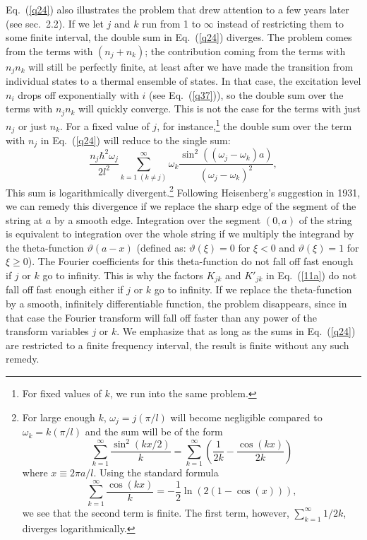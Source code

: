 \documentclass[12pt]{elsart}
\begin{document}
Eq.\ (\ref{q24}) also illustrates the problem that \citet{Heisenberg 1931} drew attention to a few years later (see sec.\ 2.2). If we let $j$ and $k$ run from 1 to $\infty$ instead of restricting them to some finite interval, the double sum in Eq.\ (\ref{q24}) diverges. The problem comes from the terms with $(n_j + n_k)$; the contribution coming from the terms with $n_j n_k$ will still be perfectly finite, at least after we have made the transition from individual states to a thermal ensemble of states. In that case, the excitation level $n_i$ drops off exponentially with $i$ (see Eq.\ (\ref{q37})), so the double sum over the terms with $n_j n_k$ will quickly converge. This is not the case for the terms with just $n_j$ or just $n_k$. For a fixed value of $j$, for instance,\footnote{For fixed values of $k$, we run into the same problem.} the  double sum over the term with $n_j$ in Eq.\ (\ref{q24}) will reduce to the single sum:
\begin{equation}
\frac{n_j \hbar^2 \omega_j}{2l^2}   \sum_{k=1 \; (k \neq j)}^{\infty} \omega_k   \frac{\sin^2{((\omega_j - \omega_k)a)}}{(\omega_j - \omega_k)^2},
\label{q24a} 
\end{equation}
This sum is logarithmically divergent.\footnote{For large enough $k$, $\omega_j = j (\pi/l)$ will become negligible compared to $\omega_k = k (\pi/l)$ and the sum will be of the form 
$$
\sum_{k=1}^{\infty}  \frac{\sin^2{(k x/2)}}{k}= \sum_{k=1}^{\infty} \left( \frac{1}{2k} - \frac{\cos{(kx)}}{2k} \right)
$$
where $x \equiv 2 \pi a/l$. Using the standard formula
$$
\sum_{k=1}^{\infty} \frac{\cos{(kx)}}{k}= -\frac{1}{2} \ln{(2(1-\cos{(x)}))},
$$  
we see that the second term is finite. The first term, however, 
$
\sum_{k=1}^{\infty} 1/2k
$,
diverges logarithmically.} Following Heisenberg's suggestion in 1931, we can remedy this divergence if we replace the sharp edge of the segment of the string at $a$ by a  smooth edge. Integration over the segment $(0, a)$ of the string is equivalent to integration over the whole string if we multiply the integrand by the theta-function $\vartheta(a - x)$ (defined as: $\vartheta(\xi) = 0$ for $\xi < 0$ and $\vartheta(\xi) = 1$ for $\xi \geq 0$). The Fourier coefficients for this theta-function do not fall off fast enough if $j$ or $k$ go to infinity. This is why the factors $K_{jk}$ and $K'_{jk}$ in Eq.\ (\ref{11a}) do not fall off fast enough either if $j$ or $k$ go to infinity. If we replace the theta-function by a smooth, infinitely differentiable function, the problem disappears, since in that case the Fourier transform will fall off faster than any power of the transform variables $j$ or $k$. We emphasize that as long as the sums in Eq.\ (\ref{q24}) are restricted to a finite frequency interval, the result is finite without any such remedy.
\end{document}
